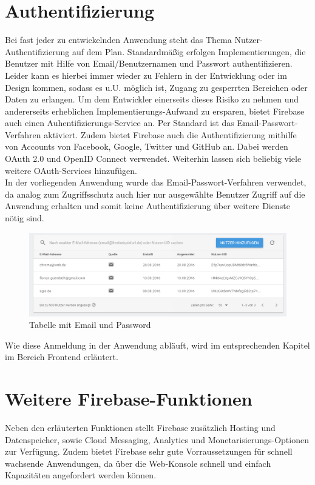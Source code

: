 \section{Authentifizierung}
Bei fast jeder zu entwickelnden Anwendung steht das Thema Nutzer-Authentifizierung auf dem Plan. Standardmäßig erfolgen Implementierungen, die Benutzer mit Hilfe von Email/Benutzernamen und Passwort authentifizieren.
Leider kann es hierbei immer wieder zu Fehlern in der Entwicklung oder im Design kommen, sodass es u.U. möglich ist, Zugang zu gesperrten Bereichen oder Daten zu erlangen.
Um dem Entwickler einerseits dieses Risiko zu nehmen und andererseits erheblichen Implementierungs-Aufwand zu ersparen, bietet Firebase auch einen Auhentifizierungs-Service an.
Per Standard ist das Email-Passwort-Verfahren aktiviert. Zudem bietet Firebase auch die Authentifizierung mithilfe von Accounts von Facebook, Google, Twitter und GitHub an. Dabei werden OAuth 2.0 und OpenID Connect verwendet. Weiterhin lassen sich
beliebig viele weitere OAuth-Services hinzufügen.\\

In der vorliegenden Anwendung wurde das Email-Passwort-Verfahren verwendet, da analog zum Zugriffsschutz auch hier nur ausgewählte Benutzer Zugriff auf die Anwendung erhalten und somit
keine Authentifizierung über weitere Dienste nötig sind.

\begin{figure}[H]
\centering\includegraphics[width=1\textwidth]{images/backend_authentication.png}
\caption{Tabelle mit Email und Password}
\label{backend_authentication}
\end{figure}

Wie diese Anmeldung in der Anwendung abläuft, wird im entsprechenden Kapitel im Bereich Frontend erläutert.

\section{Weitere Firebase-Funktionen}
Neben den erläuterten Funktionen stellt Firebase zusätzlich Hosting und Datenspeicher, sowie Cloud Messaging, Analytics und Monetarisierungs-Optionen zur Verfügung.
Zudem bietet Firebase sehr gute Vorraussetzungen für schnell wachsende Anwendungen, da über die Web-Konsole schnell und einfach Kapazitäten angefordert werden können.